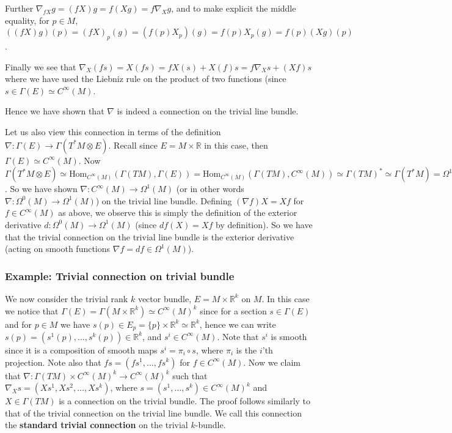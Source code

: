 \documentclass[a4paper]{article}
\theoremstyle{definition} \newtheorem*{definition}{Definition}
\theoremstyle{definition} \newtheorem*{definitions}{Definitions}
\theoremstyle{plain} \newtheorem{theorem}{Theorem}[section]
\theoremstyle{plain} \newtheorem{proposition}[theorem]{Proposition}
\theoremstyle{plain} \newtheorem{corollary}[theorem]{Corollary}
\theoremstyle{plain} \newtheorem{lemma}[theorem]{Lemma}
\theoremstyle{plain} \newtheorem{example}[theorem]{Example}
\newcommand{\defn}[1]{\textbf{#1}}
\newcommand{\realnos}{\mathbb{R}}
\newcommand{\Hom}{\text{Hom}}
\newcommand{\smooth}{C^\infty}
\begin{document}
Further $\nabla_{fX}g=(fX)g=f(Xg)=f\nabla_X g$, and to make explicit the middle equality, for $p\in M$, $((fX)g)(p)=(fX)_p(g)=(f(p)X_p)(g)=f(p)X_p(g)=f(p)(Xg)(p)$.

Finally we see that $\nabla_X(fs)=X(fs)=fX(s)+X(f)s=f\nabla_Xs + (Xf)s$ where we have used the Liebniz rule on the product of two functions (since $s\in \Gamma(E)\simeq \smooth(M)$.

Hence we have shown that $\nabla$ is indeed a connection on the trivial line bundle. 

Let us also view this connection in terms of the definition $\nabla:\Gamma(E)\to \Gamma(T^*M\otimes E)$. Recall since $E=M\times \realnos$ in this case, then $\Gamma(E)\simeq \smooth (M)$. Now $\Gamma(T^*M\otimes E)\simeq \Hom_{\smooth(M)}(\Gamma(TM), \Gamma(E)) = \Hom_{\smooth(M)}(\Gamma(TM), \smooth(M)) \simeq \Gamma(TM)^* \simeq \Gamma(T^*M)=\Omega^1(M)$. So we have shown $\nabla:\smooth(M)\to \Omega^1(M)$ (or in other words $\nabla:\Omega^0(M)\to \Omega^1(M)$) on the trivial line bundle. Defining $(\nabla f)X=Xf$ for $f\in \smooth(M)$ as above, we observe this is simply the definition of the exterior derivative $d:\Omega^0(M)\to \Omega^1(M)$ (since $df(X)=Xf$ by definition). So we have that the trivial connection on the trivial line bundle is the exterior derivative (acting on smooth functions $\nabla f=df \in \Omega^1(M)$). 

\subsubsection{Example: Trivial connection on trivial bundle}
We now consider the trivial rank $k$ vector bundle, $E=M\times \realnos^k$ on $M$. In this case we notice that $\Gamma(E)=\Gamma(M\times \realnos^k)\simeq \smooth (M)^k$ since for a section $s\in \Gamma(E)$ and for $p\in M$ we have $s(p)\in E_p=\{p\}\times \realnos^k\simeq \realnos^k$, hence we can write $s(p)=(s^1(p),\ldots, s^k(p))\in \realnos^k$, and $s^i\in \smooth(M)$. Note that $s^i$ is smooth since it is a composition of smooth maps $s^i=\pi_i\circ s$, where $\pi_i$ is the $i$'th projection. Note also that $fs=(fs^1, \ldots, fs^k)$ for $f\in \smooth(M)$. Now we claim that $\nabla:\Gamma(TM)\times \smooth(M)^k\to \smooth(M)^k$ such that $\nabla_X s = (Xs^1, Xs^2, \ldots, Xs^k)$, where $s=(s^1, \ldots, s^k)\in \smooth (M)^k$ and $X\in \Gamma(TM)$ is a connection on the trivial bundle. The proof follows similarly to that of the trivial connection on the trivial line bundle. We call this connection the \defn{standard trivial connection} on the trivial $k$-bundle. 
\end{document}
